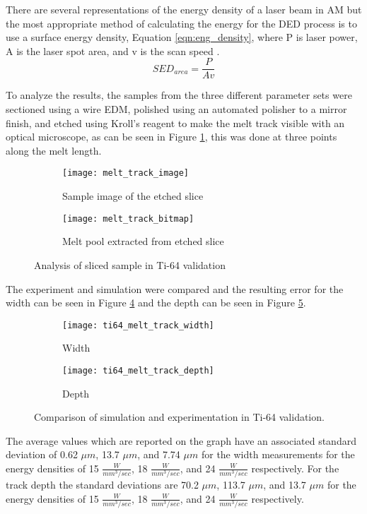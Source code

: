 There are several representations of the energy density of a laser beam in \ac{AM} but the most appropriate method of calculating the energy for the \ac{DED} process is to use a surface energy density, Equation \ref{eqn:eng_density}, where P is laser power, A is the laser spot area, and v is the scan speed \cite{kurzynowskiEffectScanningSupport2019}.
\begin{equation}
	SED_{area} = \frac{P}{A v} \label{eqn:eng_density}
\end{equation}


To analyze the results, the samples from the three different parameter sets were sectioned using a wire \ac{EDM}, polished using an automated polisher to a mirror finish, and etched using Kroll's reagent to make the melt track visible with an optical microscope, as can be seen in Figure \ref{fig:melt_track_image}, this was done at three points along the melt length.  
\begin{figure}[!htb]
	\centering
		\begin{subfigure}{0.495\textwidth}
		\texttt{[image: melt\_track\_image]}
		\caption{Sample image of the etched slice}
		\label{fig:melt_track_image}
		\end{subfigure}
			\begin{subfigure}{0.495\textwidth}
			\texttt{[image: melt\_track\_bitmap]}
			\caption{Melt pool extracted from etched slice}
			\label{fig:melt_track_bitmap}
			\end{subfigure}
	\caption{Analysis of sliced sample in Ti-64 validation}
	\label{fig:melt_track}
\end{figure}
The experiment and simulation were compared and the resulting error for the width can be seen in Figure \ref{fig:ti64_melt_track_width} and the depth can be seen in Figure \ref{fig:ti64_melt_track_depth}.
\begin{figure}[!htb]\centering
	\begin{subfigure}[c]{0.45\textwidth}\centering
	\texttt{[image: ti64\_melt\_track\_width]}
	\caption{Width}
	\label{fig:ti64_melt_track_width}
	\end{subfigure}\hfill{}
		\begin{subfigure}[c]{0.45\textwidth}\centering
		\texttt{[image: ti64\_melt\_track\_depth]}
		\caption{Depth}
		\label{fig:ti64_melt_track_depth}
		\end{subfigure}
	\caption{Comparison of simulation and experimentation in Ti-64 validation.}
	\label{fig:ti64_melt_track}
\end{figure}
The average values which are reported on the graph have an associated standard deviation of 0.62 $\mu m$, 13.7 $\mu m$, and 7.74 $\mu m$ for the width measurements for the energy densities of 15 $\frac{W}{mm^3/sec}$, 18 $\frac{W}{mm^3/sec}$, and 24 $\frac{W}{mm^3/sec}$ respectively.  For the track depth the standard deviations are 70.2 $\mu m$, 113.7 $\mu m$, and 13.7 $\mu m$ for the energy densities of 15 $\frac{W}{mm^3/sec}$, 18 $\frac{W}{mm^3/sec}$, and 24 $\frac{W}{mm^3/sec}$ respectively.


